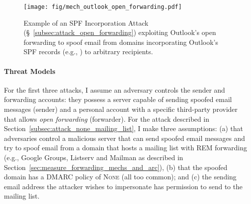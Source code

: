 \begin{figure}[t]
  \centerline{\texttt{[image: fig/mech\_outlook\_open\_forwarding.pdf]}}
  \centering
  \caption[Example of an SPF Incorporation Attack]{Example of an SPF Incorporation Attack (\S~\ref{subsec:attack_open_forwarding}) exploiting Outlook's open forwarding to spoof email from domains incorporating Outlook's SPF records (e.g., ) to arbitrary recipients.}
  \label{fig:open_forwarding_attack_mechanism}
\end{figure}


\paragraph{Threat Models}
For the first three attacks, I assume an adversary controls the
sender and forwarding accounts: they possess a server capable of
sending spoofed email messages (sender) and a personal account with a
specific third-party provider that allows \emph{open forwarding}
(forwarder). For the attack described in
Section~\ref{subsec:attack_none_mailing_list}, I make three
assumptions: (a) that adversaries control a malicious server that can
send spoofed email messages and try to spoof email from a domain that
hosts a mailing list with REM forwarding (e.g., Google Groups,
Listserv and Mailman as described in
Section~\ref{sec:measure_forwarding_mechs_and_arc}), (b) that the spoofed domain
has a DMARC policy of \textsc{None} (all too common); and (c) the
sending email address the attacker wishes to impersonate has
permission to send to the mailing list.





